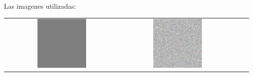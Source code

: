 Las imagenes utilizadas:

\begin{center}
	\begin{tabular}{cccc}
	  \includegraphics[width=0.45\textwidth]{imagenes/antiTEMP.jpg} &
	  \includegraphics[width=0.45\textwidth]{imagenes/random.jpg} \\
	\end{tabular}
   \end{center}

